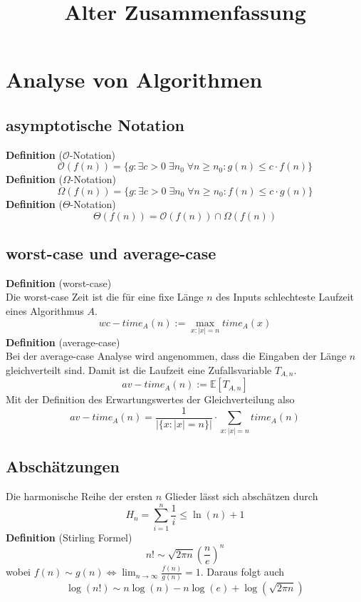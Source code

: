 \documentclass[a4paper, 12pt]{article}
\begin{document}
	\begin{titlepage} 
		\title{Alter Zusammenfassung}
		\clearpage\maketitle
		\thispagestyle{empty}
	\end{titlepage}
	\tableofcontents
	\section{Analyse von Algorithmen}
	\subsection{asymptotische Notation}
	\textbf{Definition} ($\mathcal{O}$-Notation)
	\[\mathcal{O}(f(n)) = \{g: \exists c>0\; \exists n_0 \; \forall n\geq n_0: g(n) \leq c\cdot f(n)\}\]
	\textbf{Definition} ($\Omega$-Notation)
	\[\Omega(f(n)) = \{g: \exists c>0\; \exists n_0 \; \forall n\geq n_0: f(n) \leq c\cdot g(n)\}\]
	\textbf{Definition} ($\Theta$-Notation) \[\Theta(f(n)) = \mathcal{O}(f(n)) \cap \Omega(f(n))\]

	\subsection{worst-case und average-case}
	\textbf{Definition} (worst-case)\\
	Die worst-case Zeit ist die für eine fixe Länge $n$ des Inputs schlechteste Laufzeit eines Algorithmus $A$. \[wc-time_A(n) := \max_{x: \left|x\right| = n} time_A(x)\]
	\textbf{Definition} (average-case)\\
	Bei der average-case Analyse wird angenommen, dass die Eingaben der Länge $n$ gleichverteilt sind. Damit ist die Laufzeit eine Zufallsvariable $T_{A,n}$. \[av-time_{A}(n) := \mathbb{E}[T_{A,n}]\] Mit der Definition des Erwartungswertes der Gleichverteilung also \[av-time_A(n) = \frac{1}{\left|\{x: \left|x\right| = n\}\right|} \cdot \sum_{x: \left|x\right| = n} time_A(n)\]
	\subsection{Abschätzungen}
	Die harmonische Reihe der ersten $n$ Glieder lässt sich abschätzen durch \[H_n = \sum_{i=1}^{n} \frac{1}{i} \leq \ln(n)+1\]
	\textbf{Definition} (Stirling Formel)
	\[n! \sim \sqrt{2\pi n} (\frac{n}{e})^n\]
	wobei $f(n) \sim g(n) \Leftrightarrow \lim_{n\to\infty} \frac{f(n)}{g(n)} = 1$. Daraus folgt auch \[\log(n!) \sim n\log(n) - n\log(e) + \log(\sqrt{2\pi n})\]
\end{document}
